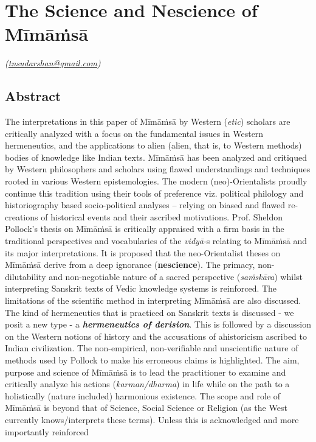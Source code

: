 \chapter{The Science and Nescience of Mīmāṁsā}\label{chapter2}


\vskip -7pt

\hfill{\sl(\url{tnsudarshan@gmail.com})}

\section*{Abstract}

The interpretations in this paper of Mīmāṁsā by Western (\textit{etic}) scholars are critically analyzed with a focus on the fundamental issues in Western hermeneutics, and the applications to alien (alien, that is, to Western methods) bodies of knowledge like Indian texts. Mīmāṁsā has been analyzed and critiqued by Western philosophers and scholars using flawed understandings and techniques rooted in various Western epistemologies. The modern (neo)-Orientalists proudly continue this tradition using their tools of preference viz. political philology and historiography based socio-political analyses – relying on biased and flawed re-creations of historical events and their ascribed motivations. Prof. Sheldon Pollock's thesis on Mīmāṁsā is critically appraised with a firm basis in the traditional perspectives and vocabularies of the \textit{vidyā}-s relating to Mīmāṁsā and its major interpretations. It is proposed that the neo-Orientalist theses on Mīmāṁsā derive from a deep ignorance (\textbf{nescience}). The primacy, non-dilutability and non-negotiable nature of a sacred perspective (\textit{saṁskāra}) whilst interpreting Sanskrit texts of Vedic knowledge systems is reinforced. The limitations of the scientific method in interpreting Mīmāṁsā are also discussed. The kind of hermeneutics that is practiced on Sanskrit texts is discussed - we posit a new type - a \textbf{\textit{hermeneutics of derision}}. This is followed by a discussion on the Western notions of history and the accusations of ahistoricism ascribed to Indian civilization. The non-empirical, non-verifiable and unscientific nature of methods used by Pollock to make his erroneous claims is highlighted. The aim, purpose and science of Mīmāṁsā is to lead the practitioner to examine and critically analyze his actions (\textit{karman/dharma}) in life while on the path to a holistically (nature included) harmonious existence. The scope and role of Mīmāṁsā is beyond that of Science, Social Science or Religion (as the West currently knows/interprets these terms). Unless this is acknowledged and more importantly reinforced 